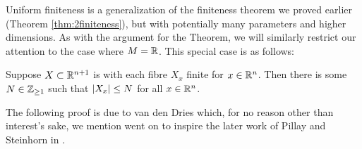 Uniform finiteness is a generalization of the finiteness theorem we proved earlier (Theorem \ref{thm:2finiteness}), but with potentially many parameters and higher dimensions. As with the argument for the \CD Theorem, we will similarly restrict our attention to the case where $M = \mathbb{R}$. This special case is as follows:

\begin{proposition}
  \label{prop:unif-finiteness}
  Suppose $X \subset \mathbb{R}^{n+1}$ is  with each fibre $X_x$ finite for $x \in \mathbb{R}^n$. Then there is some $N \in \mathbb{Z}_{\geq 1}$ such that $\vert X_x\vert \leq N$ for all $x \in \mathbb{R}^n$.
\end{proposition}


The following proof is due to van den Dries \cite{dries_remarks_1984} which, for no reason other than interest's sake, we mention went on to inspire the later work of Pillay and Steinhorn in \cite{pillay_definable_1986}.

